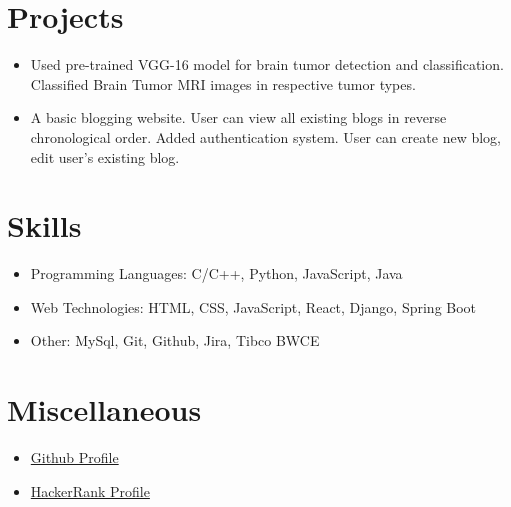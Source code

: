 \documentclass{resume}
\begin{document}
\section{Projects}
\begin{itemize}
 \item Used pre-trained VGG-16 model for brain tumor detection and classification. Classified Brain Tumor MRI images in respective tumor types.
\end{itemize}

 {}
\begin{itemize}
 \item A basic blogging website. User can view all existing blogs in reverse chronological order. Added authentication system. User can create new blog, edit user's existing blog.
\end{itemize}



\section{Skills}
\begin{itemize}[parsep=0.5ex]
  \item Programming Languages: C/C++, Python, JavaScript, Java
  \item Web Technologies: HTML, CSS, JavaScript, React, Django, Spring Boot
  \item Other: MySql, Git, Github, Jira, Tibco BWCE
\end{itemize}


\section{Miscellaneous}
\begin{itemize}[parsep=0.5ex]
  \item \href{https://github.com/AdityaKomawar}{Github Profile} 
  \item \href{https://www.hackerrank.com/adityakomawar7}{HackerRank Profile} 
\end{itemize}

%
%
\end{document}
